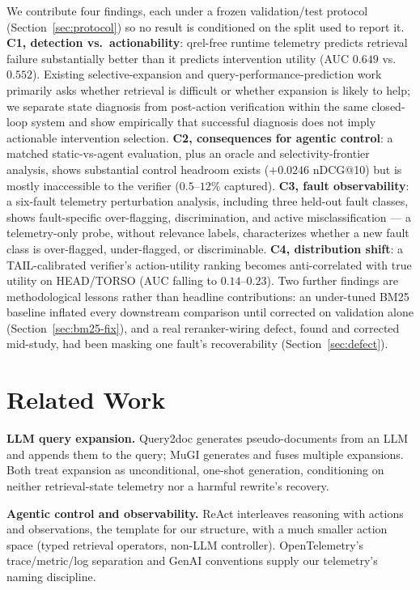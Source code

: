 \documentclass[conference]{IEEEtran}
\begin{document}
We contribute four findings, each under a frozen validation/test
protocol (Section~\ref{sec:protocol}) so no result is conditioned on
the split used to report it. \textbf{C1, detection vs.\ actionability}:
qrel-free runtime telemetry predicts retrieval failure substantially
better than it predicts intervention utility (AUC $0.649$ vs.\
$0.552$). Existing selective-expansion and query-performance-prediction
work primarily asks whether retrieval is difficult or whether
expansion is likely to help; we separate state diagnosis from
post-action verification within the same closed-loop system and show
empirically that successful diagnosis does not imply actionable
intervention selection. \textbf{C2, consequences for agentic control}: a matched
static-vs-agent evaluation, plus an oracle and selectivity-frontier
analysis, shows substantial control headroom exists ($+0.0246$
nDCG@10) but is mostly inaccessible to the verifier ($0.5$--$12\%$
captured). \textbf{C3, fault observability}: a six-fault telemetry
perturbation analysis, including three held-out fault classes, shows
fault-specific over-flagging, discrimination, and active
misclassification --- a telemetry-only probe, without relevance
labels, characterizes whether a new fault class is over-flagged,
under-flagged, or discriminable. \textbf{C4, distribution
shift}: a TAIL-calibrated verifier's action-utility ranking becomes
anti-correlated with true utility on HEAD/TORSO (AUC falling to
$0.14$--$0.23$). Two further findings are methodological lessons
rather than headline contributions: an under-tuned BM25 baseline
inflated every downstream comparison until corrected on validation
alone (Section~\ref{sec:bm25-fix}), and a real reranker-wiring defect,
found and corrected mid-study, had been masking one fault's
recoverability (Section~\ref{sec:defect}).

\section{Related Work}

\textbf{LLM query expansion.} Query2doc \cite{query2doc} generates
pseudo-documents from an LLM and appends them to the query; MuGI
\cite{mugi} generates and fuses multiple expansions. Both treat
expansion as unconditional, one-shot generation, conditioning on
neither retrieval-state telemetry nor a harmful rewrite's recovery.

\textbf{Agentic control and observability.} ReAct \cite{react}
interleaves reasoning with actions and observations, the template for
our structure, with a much smaller action space (typed retrieval
operators, non-LLM controller). OpenTelemetry's trace/metric/log
separation and GenAI conventions \cite{opentelemetry} supply our
telemetry's naming discipline.
\end{document}
